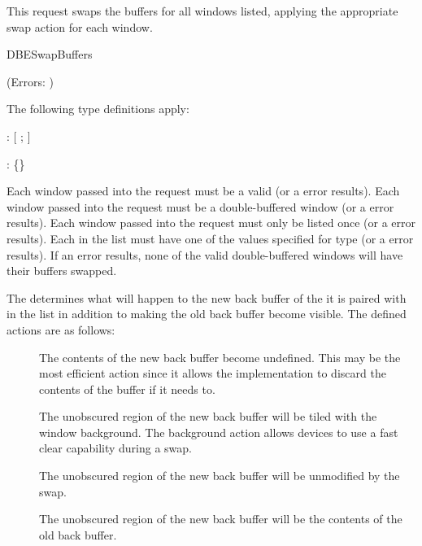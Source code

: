 This request swaps the buffers for all windows listed, applying the
appropriate swap action for each window.

\begin{arequest}{DBESwapBuffers}
\end{arequest}

                (Errors: )

The following type definitions apply:

: [
;  ]

: {\{\}}

Each window passed into the request must be a valid 
(or a  error results).
Each window passed into the request must
be a double-buffered window (or a  error results).
Each window passed into the request must only be listed once
(or a  error results).
Each  in the list must have one of the
values specified for type  (or a  error
results).  If an error results, none of the valid double-buffered
windows will have their buffers swapped.

The  determines what will happen to the new back
buffer of the  it is paired with in the list in
addition to making the old back buffer become visible.  The
defined actions are as follows:

\begin{description}
\item[]	The contents of the new back buffer become
			undefined.  This may be the most efficient
			action since it allows the implementation to
			discard the contents of the buffer if it needs
			to.

\item[]	The unobscured region of the new back buffer
			will be tiled with the window background.  The
			background action allows devices to use a fast
			clear capability during a swap.

\item[]	The unobscured region of the new back buffer
			will be unmodified by the swap.

\item[]		The unobscured region of the new back buffer
			will be the contents of the old back buffer.
\end{description}

